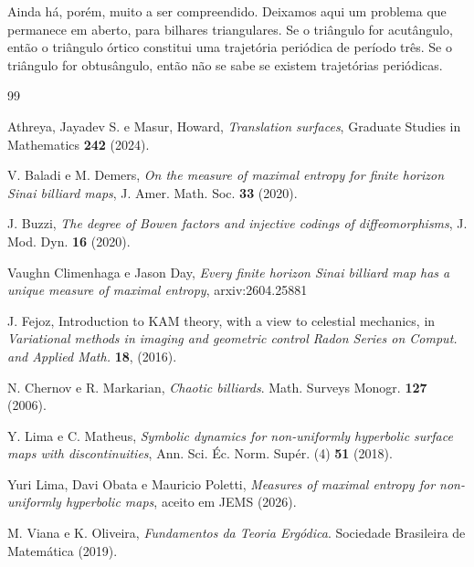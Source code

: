\documentclass{hipatia}
\theoremstyle{definition}
\theoremstyle{remark}
\numberwithin{equation}{section}
\numberwithin{theorem}{section}
\begin{document}
Ainda há, porém, muito a ser compreendido. Deixamos aqui um problema que permanece
em aberto, para bilhares triangulares. Se o triângulo for acutângulo, então o triângulo
órtico constitui uma trajetória periódica de período três. Se o triângulo for obtusângulo,
então não se sabe se existem trajetórias periódicas.



\begin{thebibliography}{99}

Athreya, Jayadev S. e Masur, Howard,
\emph{Translation surfaces}, Graduate Studies in Mathematics \textbf{242}
(2024).

V. Baladi e M. Demers, \emph{On the measure of maximal entropy for finite horizon {S}inai
              billiard maps}, J. Amer. Math. Soc. {\bf 33} (2020).

J. Buzzi,
\emph{The degree of Bowen factors and injective codings of diffeomorphisms},
J. Mod. Dyn. {\bf 16} (2020).

Vaughn Climenhaga e Jason Day,
\emph{Every finite horizon Sinai billiard map has a unique measure of maximal entropy}, arxiv:2604.25881



J. Fejoz, Introduction to KAM theory, with a view to celestial mechanics,
in \emph{Variational methods in imaging and geometric control
Radon Series on Comput. and Applied Math.} \textbf{18}, (2016).


N. Chernov e R. Markarian, \emph{Chaotic billiards}.
Math. Surveys Monogr. {\bf 127} (2006).


Y. Lima e C. Matheus,
\emph{Symbolic dynamics for non-uniformly hyperbolic surface maps with discontinuities},
Ann. Sci. Éc. Norm. Supér. (4) {\bf 51} (2018).

Yuri Lima, Davi Obata e Mauricio Poletti,
\emph{Measures of maximal entropy for non-uniformly hyperbolic maps},
aceito em JEMS (2026).



M. Viana e K. Oliveira, \emph{Fundamentos da Teoria Ergódica}.
Sociedade Brasileira de Matemática (2019).



\end{thebibliography}


\vfill
\end{document}
